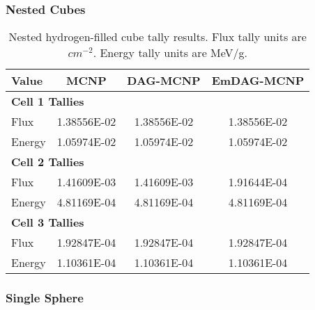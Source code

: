   \subsubsection{Nested Cubes}

  \begin{table}[H]
    \small
    \begin{center}
      \begin{tabular}{lccc}
        \toprule
        Value & MCNP & DAG-MCNP & EmDAG-MCNP \\
        \toprule
        \multicolumn{4}{l}{\textbf{Cell 1 Tallies}} \\
        \hline
        Flux    &  1.38556E-02 & 1.38556E-02 & 1.38556E-02 \\
        Energy  &  1.05974E-02 & 1.05974E-02 & 1.05974E-02 \\
        \hline
        \multicolumn{4}{l}{\textbf{Cell 2 Tallies}} \\
        \hline
        Flux    & 1.41609E-03 & 1.41609E-03 & 1.91644E-04 \\
        Energy  & 4.81169E-04 & 4.81169E-04 & 4.81169E-04 \\
        \hline
        \multicolumn{4}{l}{\textbf{Cell 3 Tallies}} \\
        \hline
        Flux    & 1.92847E-04 &  1.92847E-04 & 1.92847E-04 \\
        Energy  & 1.10361E-04 &  1.10361E-04 & 1.10361E-04 \\
        \bottomrule
        
      \end{tabular}
      \caption[Nested hydrogen-filled cube tally results.]{Nested
        hydrogen-filled cube tally results. Flux tally units are
        $cm^{-2}$. Energy tally units are MeV/g.}
      \label{nestedspheres}
    \end{center}
  \end{table}


  \subsubsection{Single Sphere}

